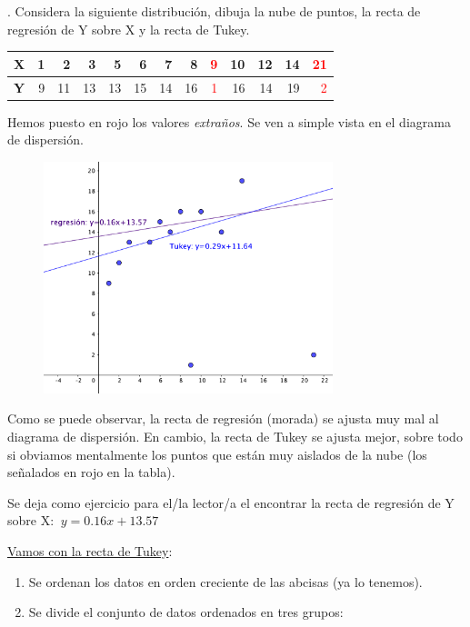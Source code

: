 \begin{example}
.	Considera la siguiente distribución, dibuja la nube de puntos, la recta de regresión de Y sobre X y la recta de Tukey.

\begin{table}[H]
\centering
\begin{tabular}{l|rrrrrrrrrrrr}
\textbf{X} & 1 & 2 & 3 & 5 & 6 & 7 & 8 & \textcolor{red}{9} & 10 & 12 & 14 & \textcolor{red}{21} \\ \hline
\textbf{Y} & 9 & 11 & 13 & 13 & 15 & 14 & 16 & \textcolor{red}{1} & 16 & 14 & 19 & \textcolor{red}{2}
\end{tabular}
\end{table}
Hemos puesto en rojo los valores \emph{extraños}. Se ven a simple vista en el diagrama de dispersión.

	\begin{figure}[H]
			\centering
			\includegraphics[width=0.75\textwidth]{imagenes/imagenes03/T03IM14.png}
	\end{figure}
Como se puede observar, la recta de regresión (morada) se ajusta muy mal al diagrama de dispersión. En cambio, la recta de Tukey se ajusta mejor, sobre todo si obviamos mentalmente los puntos que están muy aislados de la nube (los señalados en rojo en la tabla).	
	
\vspace{2mm} Se deja como ejercicio para el/la lector/a el encontrar la recta de regresión de Y sobre X: $\ y=0.16x+13.57$

\vspace{5mm} \underline{Vamos con la recta de Tukey}:

 
\begin{enumerate}
\item Se ordenan los datos en orden creciente de las abcisas (ya lo tenemos).
\item Se divide el conjunto de datos ordenados en tres grupos:


\end{enumerate}
\end{example}
